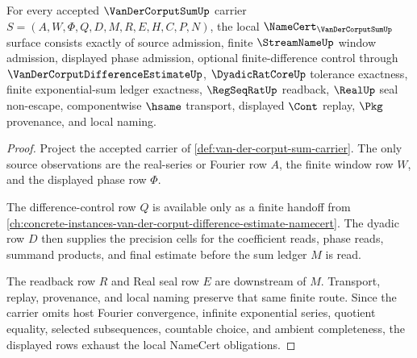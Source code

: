 \begin{theorem}
\label{thm:van-der-corput-sum-namecert-obligations}
For every accepted $\VanDerCorputSumUp$ carrier $S=(A,W,\Phi,Q,D,M,R,E,H,C,P,N)$, the local $\NameCert_{\VanDerCorputSumUp}$ surface consists exactly of source admission, finite $\StreamNameUp$ window admission, displayed phase admission, optional finite-difference control through $\VanDerCorputDifferenceEstimateUp$, $\DyadicRatCoreUp$ tolerance exactness, finite exponential-sum ledger exactness, $\RegSeqRatUp$ readback, $\RealUp$ seal non-escape, componentwise $\hsame$ transport, displayed $\Cont$ replay, $\Pkg$ provenance, and local naming.
\end{theorem}
\begin{proof}
Project the accepted carrier of \autoref{def:van-der-corput-sum-carrier}. The only source observations are the real-series or Fourier row $A$, the finite window row $W$, and the displayed phase row $\Phi$.

The difference-control row $Q$ is available only as a finite handoff from \autoref{ch:concrete-instances-van-der-corput-difference-estimate-namecert}. The dyadic row $D$ then supplies the precision cells for the coefficient reads, phase reads, summand products, and final estimate before the sum ledger $M$ is read.

The readback row $R$ and Real seal row $E$ are downstream of $M$. Transport, replay, provenance, and local naming preserve that same finite route. Since the carrier omits host Fourier convergence, infinite exponential series, quotient equality, selected subsequences, countable choice, and ambient completeness, the displayed rows exhaust the local NameCert obligations.
\end{proof}

